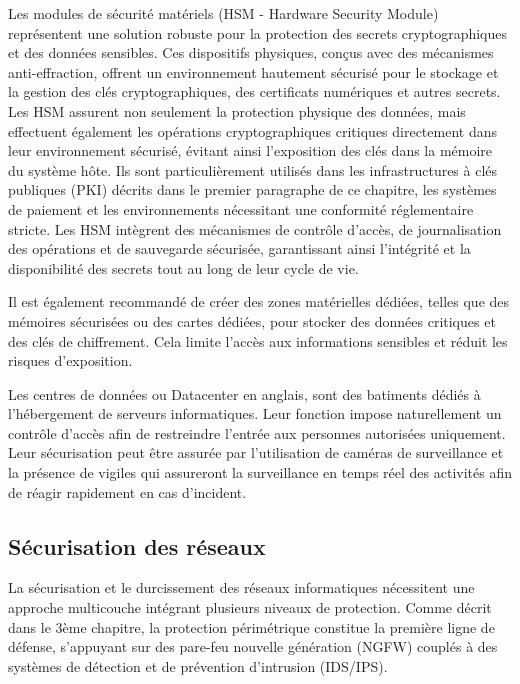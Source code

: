 Les modules de sécurité matériels (HSM - Hardware Security Module) représentent une solution robuste pour la protection des secrets cryptographiques et des données sensibles. Ces dispositifs physiques, conçus avec des mécanismes anti-effraction, offrent un environnement hautement sécurisé pour le stockage et la gestion des clés cryptographiques, des certificats numériques et autres secrets. Les HSM assurent non seulement la protection physique des données, mais effectuent également les opérations cryptographiques critiques directement dans leur environnement sécurisé, évitant ainsi l'exposition des clés dans la mémoire du système hôte. Ils sont particulièrement utilisés dans les infrastructures à clés publiques (PKI) décrits dans le premier paragraphe de ce chapitre, les systèmes de paiement et les environnements nécessitant une conformité réglementaire stricte. Les HSM intègrent des mécanismes de contrôle d'accès, de journalisation des opérations et de sauvegarde sécurisée, garantissant ainsi l'intégrité et la disponibilité des secrets tout au long de leur cycle de vie.

Il est également recommandé de créer des zones matérielles dédiées, telles que des mémoires sécurisées ou des cartes dédiées, pour stocker des données critiques et des clés de chiffrement. Cela limite l'accès aux informations sensibles et réduit les risques d'exposition.

Les centres de données ou Datacenter en anglais, sont des batiments dédiés à l'hébergement de serveurs informatiques. Leur fonction impose naturellement un contrôle d'accès afin de restreindre l'entrée aux personnes autorisées uniquement. Leur sécurisation peut être assurée par l'utilisation de caméras de surveillance et la présence de vigiles qui assureront la surveillance en temps réel des activités afin de réagir rapidement en cas d'incident.

\subsection{Sécurisation des réseaux}

La sécurisation et le durcissement des réseaux informatiques nécessitent une approche multicouche intégrant plusieurs niveaux de protection. Comme décrit dans le 3ème chapitre, la protection périmétrique constitue la première ligne de défense, s'appuyant sur des pare-feu nouvelle génération (NGFW) couplés à des systèmes de détection et de prévention d'intrusion (IDS/IPS).

